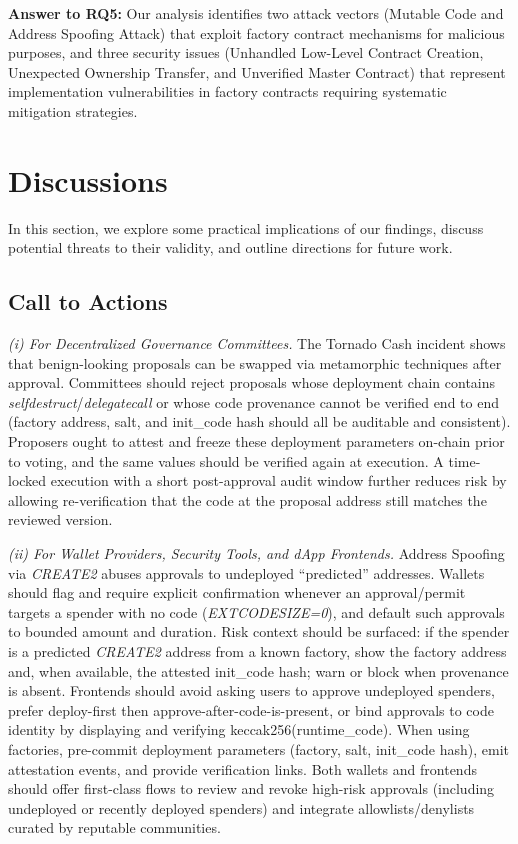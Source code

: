 \documentclass[acmsmall, screen]{acmart}
\begin{document}
	\begin{answerbox}
		\textbf{Answer to RQ5:} Our analysis identifies two attack vectors (Mutable Code and Address
		Spoofing Attack) that exploit factory contract mechanisms for malicious purposes, and three security
		issues (Unhandled Low-Level Contract Creation, Unexpected Ownership Transfer, and Unverified
		Master Contract) that represent implementation vulnerabilities in factory contracts requiring
		systematic mitigation strategies.
	\end{answerbox}

	\section{Discussions}
	\label{sec:discussions} In this section, we explore some practical implications of our findings,
	discuss potential threats to their validity, and outline directions for future work.

	\subsection{Call to Actions}
	\textit{(i) For Decentralized Governance Committees.} The Tornado Cash incident shows that
	benign-looking proposals can be swapped via metamorphic techniques after approval. Committees should
	reject proposals whose deployment chain contains \textit{selfdestruct}/\textit{delegatecall} or whose
	code provenance cannot be verified end to end (factory address, salt, and init\_code hash should
	all be auditable and consistent). Proposers ought to attest and freeze these deployment
	parameters on-chain prior to voting, and the same values should be verified again at execution.
	A time-locked execution with a short post-approval audit window further reduces risk by allowing
	re-verification that the code at the proposal address still matches the reviewed version.

	\textit{(ii) For Wallet Providers, Security Tools, and dApp Frontends.} Address Spoofing via \textit{CREATE2}
	abuses approvals to undeployed “predicted” addresses. Wallets should flag and require explicit confirmation
	whenever an approval/permit targets a spender with no code (\textit{EXTCODESIZE=0}), and default
	such approvals to bounded amount and duration. Risk context should be surfaced: if the spender is
	a predicted \textit{CREATE2} address from a known factory, show the factory address and, when
	available, the attested init\_code hash; warn or block when provenance is absent. Frontends should
	avoid asking users to approve undeployed spenders, prefer deploy-first then approve-after-code-is-present,
	or bind approvals to code identity by displaying and verifying keccak256(runtime\_code). When using
	factories, pre-commit deployment parameters (factory, salt, init\_code hash), emit attestation events,
	and provide verification links. Both wallets and frontends should offer first-class flows to review
	and revoke high-risk approvals (including undeployed or recently deployed spenders) and integrate
	allowlists/denylists curated by reputable communities.
\end{document}
